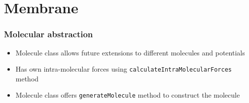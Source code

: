 \section{Membrane}
\label{sec:membrane}

\begin{frame}
    \frametitle{Molecular abstraction}
    
    \begin{itemize}
        \item Molecule class allows future extensions to different molecules and potentials
        \item Has own intra-molecular forces using \texttt{calculateIntraMolecularForces} method
        \item Molecule class offers \texttt{generateMolecule} method to construct the molecule
    \end{itemize}


\end{frame}
